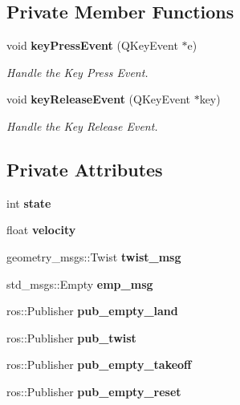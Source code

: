 \subsection*{Private Member Functions}
\begin{DoxyCompactItemize}
\item 
void {\bf key\+Press\+Event} (Q\+Key\+Event $\ast$e)
\begin{DoxyCompactList}\small\item\em Handle the Key Press Event. \end{DoxyCompactList}\item 
void {\bf key\+Release\+Event} (Q\+Key\+Event $\ast$key)
\begin{DoxyCompactList}\small\item\em Handle the Key Release Event. \end{DoxyCompactList}\end{DoxyCompactItemize}
\subsection*{Private Attributes}
\begin{DoxyCompactItemize}
\item 
int {\bfseries state}\label{classkeyboard__controller_a4296d4dabdd9bed06091159d968be284}

\item 
float {\bfseries velocity}\label{classkeyboard__controller_aa7b7cce2981ab1f4a067e455a4a44e38}

\item 
geometry\+\_\+msgs\+::\+Twist {\bfseries twist\+\_\+msg}\label{classkeyboard__controller_aa7ec9a03d00fdf4d2d4e751a55ecad0d}

\item 
std\+\_\+msgs\+::\+Empty {\bfseries emp\+\_\+msg}\label{classkeyboard__controller_aaa44aba2c4397ff6c1beb6c4b0c095a3}

\item 
ros\+::\+Publisher {\bfseries pub\+\_\+empty\+\_\+land}\label{classkeyboard__controller_acd15f5c9ecc27236e49c633b903b5065}

\item 
ros\+::\+Publisher {\bfseries pub\+\_\+twist}\label{classkeyboard__controller_ad95754cc2758fb39abdf235d4ca93d67}

\item 
ros\+::\+Publisher {\bfseries pub\+\_\+empty\+\_\+takeoff}\label{classkeyboard__controller_a74505da5155fb8fb455f7d1c9dea04bf}

\item 
ros\+::\+Publisher {\bfseries pub\+\_\+empty\+\_\+reset}\label{classkeyboard__controller_af17dde16f42eb3a6e6b5e5173ace25e2}

\end{DoxyCompactItemize}


